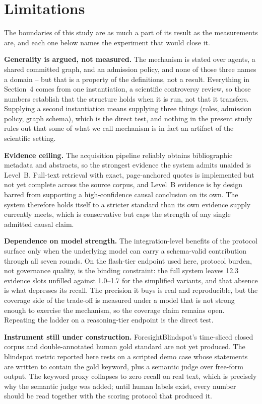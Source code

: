 \section*{Limitations}

The boundaries of this study are as much a part of its result as the
measurements are, and each one below names the experiment that would close
it.

\textbf{Generality is argued, not measured.} The mechanism is stated over
agents, a shared committed graph, and an admission policy, and none of those
three names a domain -- but that is a property of the definitions, not a
result. Everything in Section~4 comes from one instantiation, a scientific
controversy review, so those numbers establish that the structure holds when
it is run, not that it transfers. Supplying a second instantiation means
supplying three things (roles, admission policy, graph schema), which is the
direct test, and nothing in the present study rules out that some of what we
call mechanism is in fact an artifact of the scientific setting.

\textbf{Evidence ceiling.} The acquisition pipeline reliably obtains
bibliographic metadata and abstracts, so the strongest evidence the system
admits unaided is Level~B. Full-text retrieval with exact, page-anchored
quotes is implemented but not yet complete across the source corpus, and
Level~B evidence is by design barred from supporting a high-confidence
causal conclusion on its own. The system therefore holds itself to a
stricter standard than its own evidence supply currently meets, which is
conservative but caps the strength of any single admitted causal claim.

\textbf{Dependence on model strength.} The integration-level benefits of the
protocol surface only when the underlying model can carry a schema-valid
contribution through all seven rounds. On the flash-tier endpoint used here,
protocol burden, not governance quality, is the binding constraint:
the full system leaves 12.3 evidence slots unfilled against 1.0--1.7 for the
simplified variants, and that absence is what depresses its recall. The
precision it buys is real and reproducible, but the coverage side of the
trade-off is measured under a model that is not strong enough to exercise
the mechanism, so the coverage claim remains open. Repeating the ladder on a
reasoning-tier endpoint is the direct test.

\textbf{Instrument still under construction.} ForesightBlindspot's
time-sliced closed corpus and double-annotated human gold standard are not
yet produced. The blindspot metric reported here rests on a scripted demo
case whose statements are written to contain the gold keyword, plus a
semantic judge over free-form output. The keyword proxy collapses to zero
recall on real text, which is precisely why the semantic judge was added;
until human labels exist, every number should be read together with the
scoring protocol that produced it.

